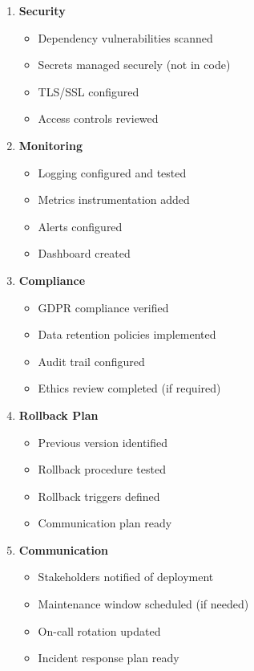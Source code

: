 \begin{enumerate}
    \item \textbf{Security}
    \begin{itemize}
        \item[ ] Dependency vulnerabilities scanned
        \item[ ] Secrets managed securely (not in code)
        \item[ ] TLS/SSL configured
        \item[ ] Access controls reviewed
    \end{itemize}

    \item \textbf{Monitoring}
    \begin{itemize}
        \item[ ] Logging configured and tested
        \item[ ] Metrics instrumentation added
        \item[ ] Alerts configured
        \item[ ] Dashboard created
    \end{itemize}

    \item \textbf{Compliance}
    \begin{itemize}
        \item[ ] GDPR compliance verified
        \item[ ] Data retention policies implemented
        \item[ ] Audit trail configured
        \item[ ] Ethics review completed (if required)
    \end{itemize}

    \item \textbf{Rollback Plan}
    \begin{itemize}
        \item[ ] Previous version identified
        \item[ ] Rollback procedure tested
        \item[ ] Rollback triggers defined
        \item[ ] Communication plan ready
    \end{itemize}

    \item \textbf{Communication}
    \begin{itemize}
        \item[ ] Stakeholders notified of deployment
        \item[ ] Maintenance window scheduled (if needed)
        \item[ ] On-call rotation updated
        \item[ ] Incident response plan ready
    \end{itemize}
\end{enumerate}


